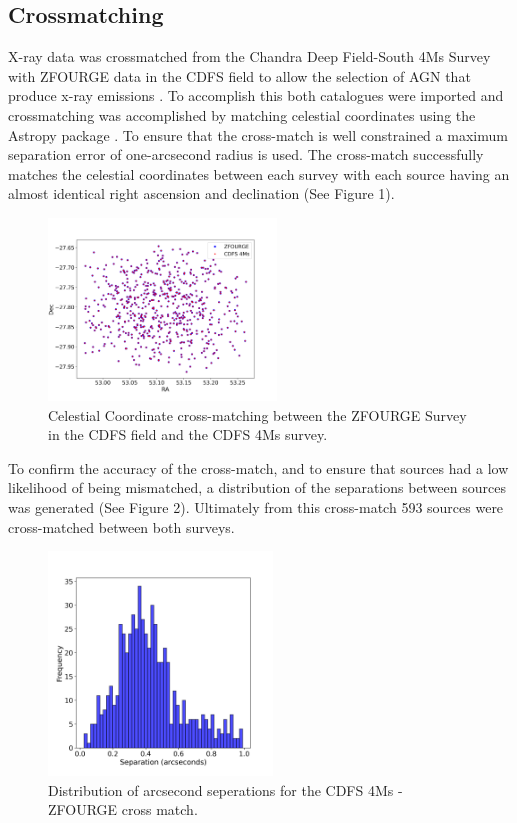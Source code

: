 \documentclass[12pt]{iopart}
\begin{document}
\subsection{Crossmatching}
X-ray data was crossmatched from the Chandra Deep Field-South 4Ms Survey \cite{xue_chandra_2011} with ZFOURGE data in the CDFS field to allow the selection of AGN that produce x-ray emissions \cite{szokoly_chandra_2004}. To accomplish this both catalogues were imported and crossmatching was accomplished by matching celestial coordinates using the Astropy package \cite{the_astropy_collaboration_astropy_2013}. To ensure that the cross-match is well constrained a maximum separation error of one-arcsecond radius is used. The cross-match successfully matches the celestial coordinates between each survey with each source having an almost identical right ascension and declination (See Figure 1).
\begin{figure}[h]
  \centering
  \includegraphics[width=0.54\textwidth]{plots/CDFS_4Ms_Xray_ZFOURGE_XMatch.png}
  \caption{Celestial Coordinate cross-matching between the ZFOURGE Survey in the CDFS field and the CDFS 4Ms survey.}
  \label{fig:your_label}
\end{figure}
To confirm the accuracy of the cross-match, and to ensure that sources had a low likelihood of being mismatched, a distribution of the separations between sources was generated (See Figure 2). Ultimately from this cross-match 593 sources were cross-matched between both surveys. 
\begin{figure}[h]
  \centering
  \includegraphics[width=0.53\textwidth]{plots/CDFS_4Ms_Xray_Sep.png}
  \caption{Distribution of arcsecond seperations for the CDFS 4Ms - ZFOURGE cross match.}
  \label{fig:your_label}
\end{figure}
\end{document}
